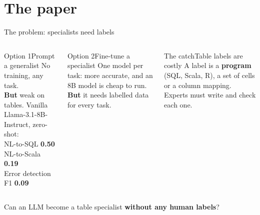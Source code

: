 \documentclass[11pt,aspectratio=169]{beamer}
\begin{document}
\section{The paper}

\begin{frame}{The problem: specialists need labels}
\vspace{0.0cm}
\begin{columns}[T]
\begin{tscard}[tsmuted]{Option 1}{Prompt a generalist}
No training, any task.\\[2pt]
\textbf{But} weak on tables. Vanilla Llama-3.1-8B-Instruct, zero-shot:\\[2pt]
NL-to-SQL \textbf{0.50}\\ NL-to-Scala \textbf{0.19}\\ Error detection F1 \textbf{0.09}
\end{tscard}
\begin{tscard}[tsnavy]{Option 2}{Fine-tune a specialist}
One model per task: more accurate, and an 8B model is cheap to run.\\[2pt]
\textbf{But} it needs labelled data for every task.
\end{tscard}
\begin{tscard}[tsred]{The catch}{Table labels are costly}
A label is a \textbf{program} (SQL, Scala, R), a set of cells or a column mapping.\\[2pt]
Experts must write and check each one.
\end{tscard}
\end{columns}
\vspace{0.2cm}
\begin{tscallout}[tspink]
\large Can an LLM become a table specialist \textbf{without any human labels}?
\end{tscallout}
\end{frame}
\end{document}
